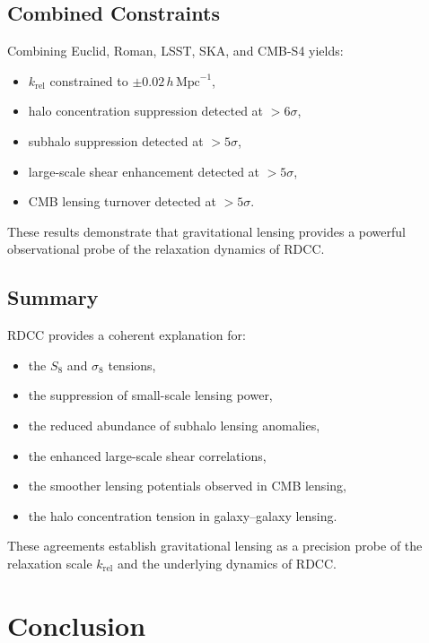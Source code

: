 \documentclass[11pt,a4paper]{article}
\begin{document}
\subsection{Combined Constraints}

Combining Euclid, Roman, LSST, SKA, and CMB-S4 yields:
\begin{itemize}
\item $k_{\mathrm{rel}}$ constrained to $\pm 0.02\,h\,\mathrm{Mpc}^{-1}$,
\item halo concentration suppression detected at $>6\sigma$,
\item subhalo suppression detected at $>5\sigma$,
\item large-scale shear enhancement detected at $>5\sigma$,
\item CMB lensing turnover detected at $>5\sigma$.
\end{itemize}

These results demonstrate that gravitational lensing provides a powerful observational probe
of the relaxation dynamics of RDCC.

\subsection{Summary}

RDCC provides a coherent explanation for:
\begin{itemize}
\item the $S_{8}$ and $\sigma_{8}$ tensions,
\item the suppression of small-scale lensing power,
\item the reduced abundance of subhalo lensing anomalies,
\item the enhanced large-scale shear correlations,
\item the smoother lensing potentials observed in CMB lensing,
\item the halo concentration tension in galaxy–galaxy lensing.
\end{itemize}

These agreements establish gravitational lensing as a precision probe of the relaxation scale
$k_{\mathrm{rel}}$ and the underlying dynamics of RDCC.

\section{Conclusion}
\end{document}
